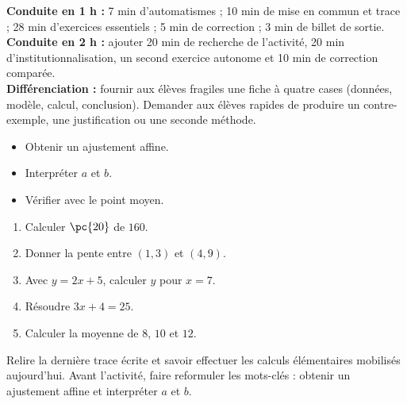 \ifmxteacher
\begin{method}
\textbf{Conduite en 1 h :} 7 min d'automatismes ; 10 min de mise en commun et trace ; 28 min d'exercices essentiels ; 5 min de correction ; 3 min de billet de sortie.\\
\textbf{Conduite en 2 h :} ajouter 20 min de recherche de l'activité, 20 min d'institutionnalisation, un second exercice autonome et 10 min de correction comparée.\\
\textbf{Différenciation :} fournir aux élèves fragiles une fiche à quatre cases (données, modèle, calcul, conclusion). Demander aux élèves rapides de produire un contre-exemple, une justification ou une seconde méthode.
\end{method}
\fi
{}
\begin{objectives}\begin{itemize}\item Obtenir un ajustement affine.\item Interpréter $a$ et $b$.\item Vérifier avec le point moyen.\end{itemize}\end{objectives}
\begin{fluency}\begin{enumerate}\item Calculer $\pc{20}$ de $160$. \item Donner la pente entre $(1,3)$ et $(4,9)$. \item Avec $y=2x+5$, calculer $y$ pour $x=7$. \item Résoudre $3x+4=25$. \item Calculer la moyenne de $8$, $10$ et $12$. \end{enumerate}\end{fluency}
\begin{prerequisites}Relire la dernière trace écrite et savoir effectuer les calculs élémentaires mobilisés aujourd'hui. Avant l'activité, faire reformuler les mots-clés : obtenir un ajustement affine et interpréter $a$ et $b$.\end{prerequisites}

